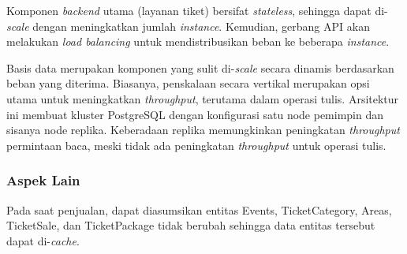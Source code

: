 Komponen \textit{backend} utama (layanan tiket) bersifat \textit{stateless}, sehingga dapat di-\textit{scale} dengan meningkatkan jumlah \textit{instance}. Kemudian, gerbang API akan melakukan \textit{load balancing} untuk mendistribusikan beban ke beberapa \textit{instance}.

Basis data merupakan komponen yang sulit di-\textit{scale} secara dinamis berdasarkan beban yang diterima. Biasanya, penskalaan secara vertikal merupakan opsi utama untuk meningkatkan \textit{throughput}, terutama dalam operasi tulis. Arsitektur ini membuat kluster PostgreSQL dengan konfigurasi satu node pemimpin dan sisanya node replika. Keberadaan replika memungkinkan peningkatan \textit{throughput} permintaan baca, meski tidak ada peningkatan \textit{throughput} untuk operasi tulis.

\subsubsection{Aspek Lain}

Pada saat penjualan, dapat diasumsikan entitas Events, TicketCategory, Areas, TicketSale, dan TicketPackage tidak berubah sehingga data entitas tersebut dapat di-\textit{cache}.